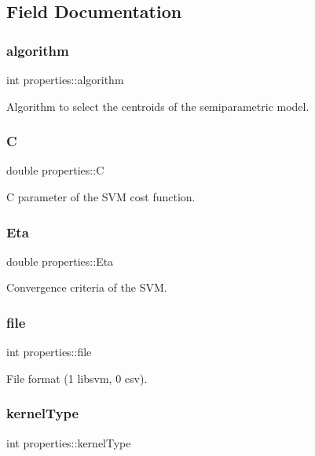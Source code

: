 \subsection{Field Documentation}
\hypertarget{structproperties_aa0ba665a115d2e69811c694bc1af5096}{}\label{structproperties_aa0ba665a115d2e69811c694bc1af5096} 
\subsubsection{\texorpdfstring{algorithm}{algorithm}}
{\ttfamily int properties\+::algorithm}

Algorithm to select the centroids of the semiparametric model. \hypertarget{structproperties_a3b98814395b295db30f029e5e67ae9c9}{}\label{structproperties_a3b98814395b295db30f029e5e67ae9c9} 
\subsubsection{\texorpdfstring{C}{C}}
{\ttfamily double properties\+::C}

C parameter of the S\+VM cost function. \hypertarget{structproperties_abd91deb543a31a6a1f75892af7cf95c8}{}\label{structproperties_abd91deb543a31a6a1f75892af7cf95c8} 
\subsubsection{\texorpdfstring{Eta}{Eta}}
{\ttfamily double properties\+::\+Eta}

Convergence criteria of the S\+VM. \hypertarget{structproperties_a184d36a53db3e72b771bde8bd8e782f9}{}\label{structproperties_a184d36a53db3e72b771bde8bd8e782f9} 
\subsubsection{\texorpdfstring{file}{file}}
{\ttfamily int properties\+::file}

File format (1 libsvm, 0 csv). \hypertarget{structproperties_a2cb295bd30c81b5bec52b79e67106881}{}\label{structproperties_a2cb295bd30c81b5bec52b79e67106881} 
\subsubsection{\texorpdfstring{kernel\+Type}{kernelType}}
{\ttfamily int properties\+::kernel\+Type}

